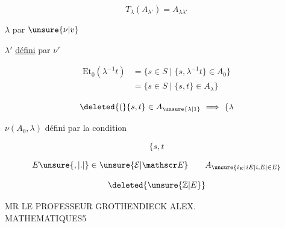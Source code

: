 
\[
T_\lambda(A_{\lambda'})=A_{\lambda\lambda'}
\]

$\lambda$ \uline{} par $\unsure{\nu|v}$

$\lambda'$ \uline{défini} par $\nu'$

\[
\begin{aligned}
\mathrm{Et}_0(\lambda^{-1}t)&=\{s\in S\mid\{s,\lambda^{-1}t\}\in A_0\}\\
&=\{s\in S\mid\{s,t\}\in A_\lambda\}
\end{aligned}
\]

\[
\deleted{(}\{s,t\}\in A_{\unsure{\lambda|1}}\ \Longrightarrow\ \{\lambda
\]

$\nu(A_0,\lambda)$ défini par la condition

\[
\{s,t
\]

\[
E\unsure{,|.|{}}\in\unsure{\mathcal E|\mathscr E}\qquad A_{\unsure{i_E|iE|i,E|\in E}}
\]

\[
\deleted{\unsure{\mathbb Z|E}}
\]

MR LE PROFESSEUR GROTHENDIECK ALEX.\\
MATHEMATIQUES\hfill 5

